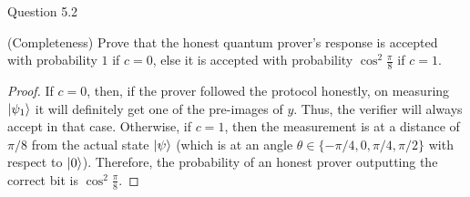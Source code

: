 \begin{solution}{Question 5.2}\label{ques:52}
    \begin{question}
        (Completeness) Prove that the honest quantum prover’s response is accepted with probability $1$ if $c = 0$, else it is accepted with probability $\cos^2\frac{\pi}{8}$ if $c = 1$.
    \end{question}
    \tcblower{}
    \begin{proof}
        If $c = 0$, then, if the prover followed the protocol honestly, on measuring $\ket{\psi_1}$ it will definitely get one of the pre-images of $y$. Thus, the verifier will always accept in that case. Otherwise, if $c = 1$, then the measurement is at a distance of $\pi/8$ from the actual state $\ket{\psi}$ (which is at an angle $\theta \in \{-\pi/4, 0, \pi/4, \pi/2\}$ with respect to $\ket{0}$). Therefore, the probability of an honest prover outputting the correct bit is $\cos^2\frac{\pi}{8}$.
    \end{proof}
\end{solution}
 
